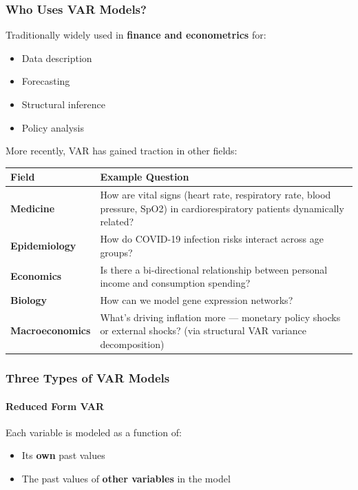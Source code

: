 \documentclass[12pt,openany]{book}
\begin{document}
\subsubsection{Who Uses VAR Models?}

Traditionally widely used in \textbf{finance and econometrics} for:
\begin{itemize}[leftmargin=*]
    \item Data description
    \item Forecasting
    \item Structural inference
    \item Policy analysis
\end{itemize}

More recently, VAR has gained traction in other fields:

\begin{center}
\begin{tabular}{|L{0.28\textwidth}|L{0.62\textwidth}|}
\hline
Field & Example Question \\
\hline
\textbf{Medicine} & How are vital signs (heart rate, respiratory rate, blood pressure, SpO2) in cardiorespiratory patients dynamically related? \\
\hline
\textbf{Epidemiology} & How do COVID-19 infection risks interact across age groups? \\
\hline
\textbf{Economics} & Is there a bi-directional relationship between personal income and consumption spending? \\
\hline
\textbf{Biology} & How can we model gene expression networks? \\
\hline
\textbf{Macroeconomics} & What's driving inflation more --- monetary policy shocks or external shocks? (via structural VAR variance decomposition) \\
\hline
\end{tabular}
\end{center}

\subsubsection{Three Types of VAR Models}

\paragraph{Reduced Form VAR}

Each variable is modeled as a function of:
\begin{itemize}[leftmargin=*]
    \item Its \textbf{own} past values
    \item The past values of \textbf{other variables} in the model
\end{itemize}
\end{document}
